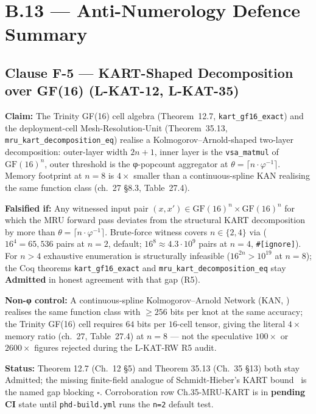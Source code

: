 \section*{B.13 — Anti-Numerology Defence Summary}
\label{sec:anti-numerology}

\subsection*{Clause F-5 — KART-Shaped Decomposition over GF(16) (L-KAT-12, L-KAT-35)}
\label{sec:falsifier-kart-gf16}

\begin{tcolorbox}[colback=red!5,colframe=red!40,title=Falsifier F-5]
\textbf{Claim:} The Trinity GF(16) cell algebra (Theorem~12.7,
\texttt{kart\_gf16\_exact}) and the deployment-cell Mesh-Resolution-Unit
(Theorem~35.13, \texttt{mru\_kart\_decomposition\_eq}) realise a
Kolmogorov–Arnold-shaped two-layer decomposition: outer-layer width
$2n+1$, inner layer is the \texttt{vsa\_matmul} of
$\mathrm{GF}(16)^n$, outer threshold is the φ-popcount aggregator at
$\theta = \lceil n \cdot \varphi^{-1} \rceil$. Memory footprint at
$n = 8$ is $4\times$ smaller than a continuous-spline KAN realising the
same function class (ch.\ 27 \S 8.3, Table~27.4).

\textbf{Falsified if:} Any witnessed input pair $(x, x') \in
\mathrm{GF}(16)^n \times \mathrm{GF}(16)^n$ for which the MRU forward
pass deviates from the structural KART decomposition by more than
$\theta = \lceil n \cdot \varphi^{-1} \rceil$. Brute-force witness covers
$n \in \{2, 4\}$ via
($16^4 = 65{,}536$ pairs at $n=2$, default; $16^8 \approx 4.3 \cdot 10^9$
pairs at $n=4$, \texttt{\#[ignore]}). For $n > 4$ exhaustive enumeration
is structurally infeasible ($16^{2n} > 10^{19}$ at $n = 8$); the Coq
theorems \texttt{kart\_gf16\_exact} and
\texttt{mru\_kart\_decomposition\_eq} stay \textbf{Admitted} in honest
agreement with that gap (R5).

\textbf{Non-φ control:} A continuous-spline Kolmogorov–Arnold Network
(KAN, \cite{liu2024kan}) realises the same function class with
$\geq 256$ bits per knot at the same accuracy; the Trinity GF(16) cell
requires $64$ bits per $16$-cell tensor, giving the literal $4\times$
memory ratio (ch.\ 27, Table~27.4) at $n=8$ — not the speculative
$100\times$ or $2600\times$ figures rejected during the L-KAT-RW R5
audit.

\textbf{Status:} Theorem 12.7 (Ch.~12 \S 5) and Theorem 35.13 (Ch.~35
\S 13) both stay Admitted; the missing finite-field analogue of
Schmidt-Hieber's KART bound~\cite{schmidhuber_dl_review} is the
named gap blocking $\square$. Corroboration row Ch.35-MRU-KART is in
\textbf{pending CI} state until \texttt{phd-build.yml} runs the
\texttt{n=2} default test.
\end{tcolorbox}


